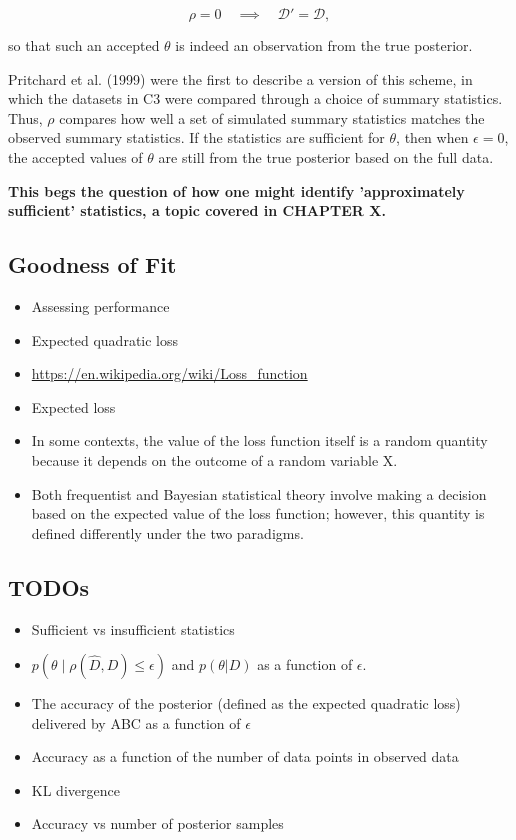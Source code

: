 \begin{equation*}
    \rho = 0 \quad \implies \quad \mathcal{D}'=\mathcal{D},
\end{equation*}

so that such an accepted $\theta$ is indeed an observation from the true posterior. 

Pritchard et al. (1999) were the first to describe a version of this scheme, in which the datasets in C3 were compared through a choice of summary statistics. Thus, $\rho$ compares how well a set of simulated summary statistics matches the observed summary statistics. If the statistics are sufficient for $\theta$, then when $\epsilon=0$, the accepted values of $\theta$ are still from the true posterior based on the full data. 

\textbf{This begs the question of how one might identify 'approximately sufficient' statistics, a topic covered in CHAPTER X.}

\subsection{Goodness of Fit}

\begin{itemize}
    \item Assessing performance 
    \item Expected quadratic loss
    \item \url{https://en.wikipedia.org/wiki/Loss_function}
    \item Expected loss
    \item In some contexts, the value of the loss function itself is a random quantity because it depends on the outcome of a random variable X.
    \item Both frequentist and Bayesian statistical theory involve making a decision based on the expected value of the loss function; however, this quantity is defined differently under the two paradigms.
\end{itemize}

\subsection{TODOs}

\begin{itemize}
    \item Sufficient vs insufficient statistics 
    \item $p(\theta \mid \rho (\hat{D}, D) \leq \epsilon)$ and $p(\theta |D)$ as a function of $\epsilon$. 
    \item The accuracy of the posterior (defined as the expected quadratic loss) delivered by ABC as a function of $\epsilon$
    \item Accuracy as a function of the number of data points in observed data
    \item KL divergence
    \item Accuracy vs number of posterior samples
\end{itemize}


